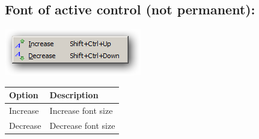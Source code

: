 \hypertarget{menu_view_fontsize}{}
\subsection{Font of active control (not permanent):}

\includegraphics[scale=0.50]{./res/menu_fontsize_generic.png}\\

\begin{scriptsize}\begin{tabularx}{\textwidth}{>{\hsize=0.3\hsize}X>{\hsize=0.7\hsize}X}\\
    \hline
    \textbf{Option} & \textbf{Description} \\
    \hline
    Increase & Increase font size \\
    Decrease & Decrease font size \\
    \hline
  \end{tabularx}\end{scriptsize}
